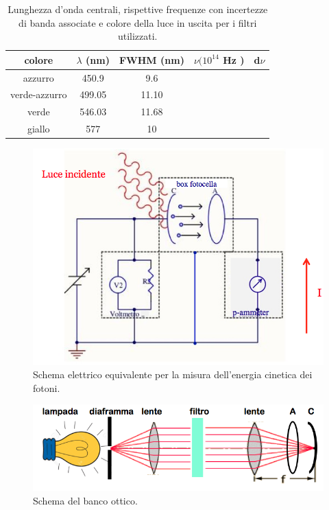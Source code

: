 \documentclass[10pt,a4paper]{article}
\begin{document}
\begin{table}[h]
\caption{\small Lunghezza d'onda centrali, rispettive frequenze con incertezze di banda associate e colore della luce in uscita per i filtri utilizzati. }
\label{tab:filtri}
\begin{center}
\begin{tabular}{|c|c|c|c|c|}
\hline
colore & $\lambda$ (nm) & FWHM (nm) & $\nu (10^{14} $ Hz ) & d$\nu$   \\
\hline 
azzurro & 450.9 & 9.6 & & \\
\hline
verde-azzurro & 499.05 & 11.10 & &\\
\hline
verde & 546.03  & 11.68 & &\\
\hline
giallo & 577  &  10 & & \\
\hline
\end{tabular}
\end{center}
\end{table}

\begin{figure}[h]
\begin{center}
\includegraphics[width=0.5\linewidth]{immagini/circuito_equivalente.png}
\caption{\small Schema elettrico equivalente per la misura dell'energia cinetica dei fotoni. }
\label{fig:cireq}
\end{center}
\end{figure}

\begin{figure}[h]
\begin{center}
\includegraphics[width=0.5\linewidth]{immagini/schema_banco.png}
\caption{\small Schema del banco ottico. }
\label{fig:schemabanco}
\end{center}
\end{figure}

\newpage
\end{document}
